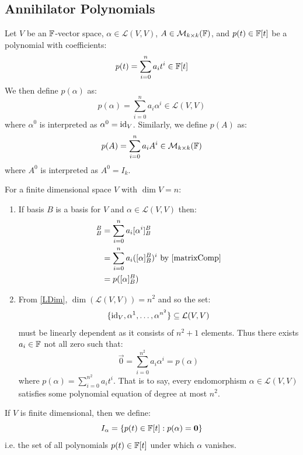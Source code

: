\documentclass[../main.tex]{subfiles}
\begin{document}
\subsection{Annihilator Polynomials}
\begin{definition}
  Let $V$ be an $\mathbb{F}$-vector space, $\alpha \in \mathcal{L}(V, V)$, $A \in \mathcal{M}_{k \times k}(\mathbb{F})$, and $p(t) \in \mathbb{F}[t]$ be a polynomial with coefficients:
  \[
    p(t) = \sum_{i = 0}^{n} a_i t^i \in \mathbb{F}[t]
  \]
  We then define $p(\alpha)$ as:
  \[
    p(\alpha) = \sum_{i = 0}^{n} a_i \alpha^{i} \in \mathcal{L}(V, V)
  \]
  where $\alpha^{0}$ is interpreted as $\alpha^{0} = \mathrm{id}_V$.
  Similarly, we define $p(A)$ as:
  \[
    p(A) = \sum_{i = 0}^{n} a_i A^{i} \in \mathcal{M}_{k \times k}(\mathbb{F})
  \]
  where $A^{0}$ is interpreted as $A^{0} = I_k$.
\end{definition}
\begin{remark}
  For a finite dimensional space $V$ with $\dim V = n$:
  \begin{enumerate}
    \item If basis $B$ is a basis for $V$ and $\alpha \in \mathcal{L}(V, V)$ then:
      \begin{align*}
        [p(\alpha)]^{B}_{B} &= \sum_{i = 0}^{n} a_i [\alpha^{i}]^{B}_{B} \\
                            &= \sum_{i = 0}^{n} a_i ([\alpha]^{B}_{B})^i \text{ by \cref{matrixComp}}\\
                            &= p([\alpha]^{B}_{B})
      \end{align*}
    \item From \cref{LDim}, $\dim(\mathcal{L}(V, V)) = n^2$ and so the set:
      \[
        \{\mathrm{id}_V, \alpha^{1}, \ldots, \alpha^{n^2}\} \subseteq \mathcal{L}(V, V)
      \]
      must be linearly dependent as it consists of $n^2 + 1$ elements.
      Thus there exists $a_i \in \mathbb{F}$ not all zero such that:
      \[
        \vec{0} = \sum_{i = 0}^{n^2}  a_i \alpha^{i} = p(\alpha)
      \]
      where $p(\alpha) = \sum_{i = 0}^{n^2} a_i t^i$.
      That is to say, every endomorphism $\alpha \in \mathcal{L}(V, V)$ satisfies some polynomial equation of degree at most $n^2$.
  \end{enumerate}
\end{remark}
\begin{remark}[Notation]
  If $V$ is finite dimensional, then we define:
  \[
    I_{\alpha} = \{p(t) \in \mathbb{F}[t]: p(\alpha) = \mathbf{\bm{0}}\}
  \]
  i.e. the set of all polynomials $p(t) \in \mathbb{F}[t]$ under which $\alpha$ vanishes.
\end{remark}
\end{document}
